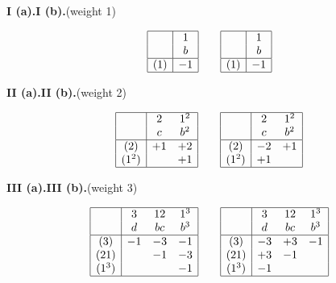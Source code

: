\documentclass[11pt]{article}
\begin{document}
\bigskip

\begin{center}\textbf{I (a).}\quad\textbf{I (b).}\quad (weight 1)\end{center}
\[
\begin{array}{|c|c|}
\hline
    & 1 \\
    & b \\ \hline
(1) & -1 \\ \hline
\end{array}
\qquad
\begin{array}{|c|c|}
\hline
    & 1 \\
    & b \\ \hline
(1) & -1 \\ \hline
\end{array}
\]

\medskip

\begin{center}\textbf{II (a).}\quad\textbf{II (b).}\quad (weight 2)\end{center}
\[
\begin{array}{|c|cc|}
\hline
      & 2  & 1^2 \\
      & c  & b^2 \\ \hline
(2)   & +1 & +2 \\
(1^2) &    & +1 \\ \hline
\end{array}
\qquad
\begin{array}{|c|cc|}
\hline
      & 2  & 1^2 \\
      & c  & b^2 \\ \hline
(2)   & -2 & +1 \\
(1^2) & +1 &    \\ \hline
\end{array}
\]

\medskip

\begin{center}\textbf{III (a).}\quad\textbf{III (b).}\quad (weight 3)\end{center}
\[
\begin{array}{|c|ccc|}
\hline
      & 3  & 12 & 1^3 \\
      & d  & bc & b^3 \\ \hline
(3)   & -1 & -3 & -1 \\
(21)  &    & -1 & -3 \\
(1^3) &    &    & -1 \\ \hline
\end{array}
\qquad
\begin{array}{|c|ccc|}
\hline
      & 3  & 12 & 1^3 \\
      & d  & bc & b^3 \\ \hline
(3)   & -3 & +3 & -1 \\
(21)  & +3 & -1 &    \\
(1^3) & -1 &    &    \\ \hline
\end{array}
\]
\end{document}
